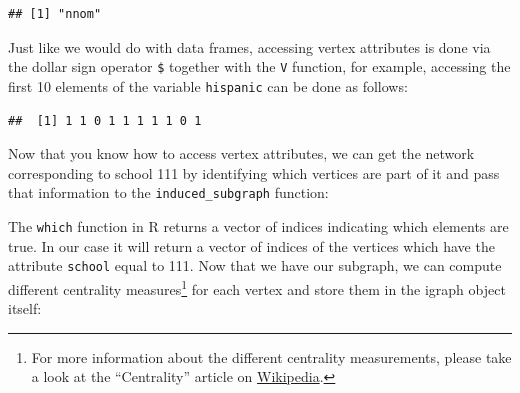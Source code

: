 \documentclass[
]{book}
\newenvironment{Shaded}{\begin{snugshade}}{\end{snugshade}}
\newcommand{\AttributeTok}[1]{\textcolor[rgb]{0.77,0.63,0.00}{#1}}
\newcommand{\CommentTok}[1]{\textcolor[rgb]{0.56,0.35,0.01}{\textit{#1}}}
\newcommand{\DecValTok}[1]{\textcolor[rgb]{0.00,0.00,0.81}{#1}}
\newcommand{\FunctionTok}[1]{\textcolor[rgb]{0.00,0.00,0.00}{#1}}
\newcommand{\NormalTok}[1]{#1}
\newcommand{\OtherTok}[1]{\textcolor[rgb]{0.56,0.35,0.01}{#1}}
\newcommand{\SpecialCharTok}[1]{\textcolor[rgb]{0.00,0.00,0.00}{#1}}
\begin{document}
\begin{verbatim}
## [1] "nnom"
\end{verbatim}

Just like we would do with data frames, accessing vertex attributes is done via the dollar sign operator \texttt{\$} together with the \texttt{V} function, for example, accessing the first 10 elements of the variable \texttt{hispanic} can be done as follows:

\begin{Shaded}
\end{Shaded}

\begin{verbatim}
##  [1] 1 1 0 1 1 1 1 1 0 1
\end{verbatim}

Now that you know how to access vertex attributes, we can get the network corresponding to school 111 by identifying which vertices are part of it and pass that information to the \texttt{induced\_subgraph} function:

\begin{Shaded}
\end{Shaded}

The \texttt{which} function in R returns a vector of indices indicating which elements are true. In our case it will return a vector of indices of the vertices which have the attribute \texttt{school} equal to 111. Now that we have our subgraph, we can compute different centrality measures\footnote{For more information about the different centrality measurements, please take a look at the ``Centrality'' article on \href{https://en.wikipedia.org/wiki/Centrality}{Wikipedia}.} for each vertex and store them in the igraph object itself:
\end{document}
